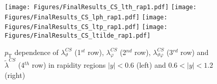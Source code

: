 \documentclass[12pt]{article}
\newcommand{\pT}{p_\mathrm{T}}
\newcommand{\absy}{\left |  y \right |}
\newcommand{\lamthCS}{\lambda^{\scriptscriptstyle CS}_\vartheta}
\newcommand{\lamphCS}{\lambda^{\scriptscriptstyle CS}_\varphi}
\newcommand{\lamthphCS}{\lambda^{\scriptscriptstyle CS}_{\vartheta \varphi}}
\newcommand{\lamtildeCS}{\tilde{\lambda}^{\scriptscriptstyle CS}}
\begin{document}
\begin{figure}[htbp]
\centering
\texttt{[image: Figures/FinalResults\_CS\_lth\_rap1.pdf]}
\texttt{[image: Figures/FinalResults\_CS\_lph\_rap1.pdf]}
\texttt{[image: Figures/FinalResults\_CS\_ltp\_rap1.pdf]}
\texttt{[image: Figures/FinalResults\_CS\_ltilde\_rap1.pdf]}
\caption{$\pT$ dependence of $\lamthCS$
(1$^{st}$ row), $\lamphCS$ (2$^{nd}$ row), $\lamthphCS$ (3$^{rd}$ row) and 
$\lamtildeCS$ (4$^{th}$ row) in rapidity regions $\absy<0.6$ (left) and
$0.6<\absy<1.2$ (right)}
\end{figure}
\clearpage
\end{document}
